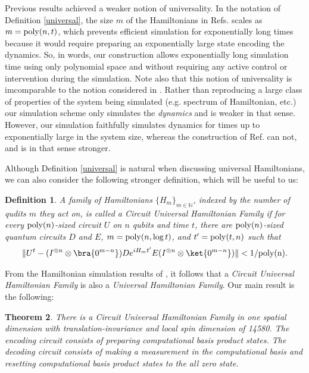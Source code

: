 \documentclass[11pt,letterpaper]{article}
\newtheorem{theorem}{Theorem}
\newtheorem{definition}[theorem]{Definition}
\newcommand{\<}{\langle}
\renewcommand{\>}{\rangle}
\begin{document}
Previous results \cite{VC,NW} achieved a weaker notion of universality. In the notation of Definition \ref{universal}, the size $m$ of the Hamiltonians in Refs. \cite{VC,NW} scales as $m = {\rm{poly}}(n,t)$, which prevents efficient simulation for exponentially long times because it would require preparing an exponentially large state encoding the dynamics. So, in words, our construction allows exponentially long simulation time using only polynomial space and without requiring any active control or intervention during the simulation. Note also that this notion of universality is imcomparable to the notion considered in \cite{cubmont}. Rather than reproducing a large class of properties of the system being simulated (e.g. spectrum of Hamiltonian, etc.) our simulation scheme only simulates the \emph{dynamics} and is weaker in that sense. However, our simulation faithfully simulates dynamics for times up to exponentially large in the system size, whereas the construction of Ref. \cite{cubmont} can not, and is in that sense stronger.

Although Definition \ref{universal} is natural when discussing universal Hamiltonians, we can also consider the following stronger definition, which will be useful to us:
\begin{definition} \label{universalcircuit}
	A family of Hamiltonians $\{ H_m \}_{m \in \mathbb{N}}$, indexed by the number of qudits $m$ they act on, is called a \emph{Circuit Universal Hamiltonian Family} if for every ${\rm{poly}}(n)$-sized circuit $U$ on $n$ qubits and time $t$, there are ${\rm{poly}}(n)$-sized quantum circuits $D$ and $E$, $m={\rm{poly}}(n,\log{t})$, and $t'={\rm{poly}}(t, n)$ such that
	\begin{eqnarray}
		\| U^t-  (I^{\otimes n} \otimes \bra{0^{m-n}})De^{iH_mt'}E(I^{\otimes n} \otimes \ket{0^{m-n}})  \|< 1/\rm{poly}(n). 
	\end{eqnarray}
\end{definition}

From the Hamiltonian simulation results of \cite{berry2015hamiltonian}, it follows that a \emph{Circuit Universal Hamiltonian Family} is also a \emph{Universal Hamiltonian Family}. Our main result is the following:
\begin{theorem} \label{main}
There is a \emph{Circuit Universal Hamiltonian Family} in one spatial dimension with translation-invariance and local spin dimension of 14580. The encoding circuit consists of preparing computational basis product states. The decoding circuit consists of making a measurement in the computational basis and resetting computational basis product states to the all zero state. 
\end{theorem}
\end{document}
